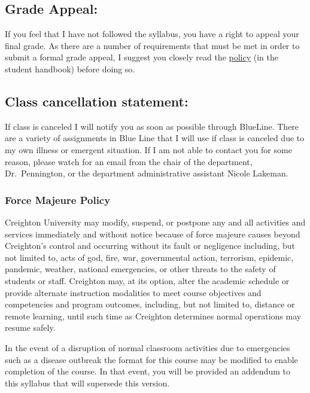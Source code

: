 \documentclass[
  11pt,
  letterpaper,
  DIV=11,
  numbers=noendperiod]{scrartcl}
\begin{document}
\subsection{Grade Appeal:}\label{grade-appeal}

If you feel that I have not followed the syllabus, you have a right to
appeal your final grade. As there are a number of requirements that must
be met in order to submit a formal grade appeal, I suggest you closely
read the
\href{https://catalog.creighton.edu/pharmacy-health-professions/administration-academic-policies/grade-appeals-policy/grade-appeals-policy.pdf}{policy}
(in the student handbook) before doing so.

\subsection{Class cancellation
statement:}\label{class-cancellation-statement}

If class is canceled I will notify you as soon as possible through
BlueLine. There are a variety of assignments in Blue Line that I will
use if class is canceled due to my own illness or emergent situation. If
I am not able to contact you for some reason, please watch for an email
from the chair of the department, Dr.~Pennington, or the department
administrative assistant Nicole Lakeman.

\subsubsection{Force Majeure Policy}\label{force-majeure-policy}

Creighton University may modify, suspend, or postpone any and all
activities and services immediately and without notice because of force
majeure causes beyond Creighton's control and occurring without its
fault or negligence including, but not limited to, acts of god, fire,
war, governmental action, terrorism, epidemic, pandemic, weather,
national emergencies, or other threats to the safety of students or
staff. Creighton may, at its option, alter the academic schedule or
provide alternate instruction modalities to meet course objectives and
competencies and program outcomes, including, but not limited to,
distance or remote learning, until such time as Creighton determines
normal operations may resume safely.

In the event of a disruption of normal classroom activities due to
emergencies such as a disease outbreak the format for this course may be
modified to enable completion of the course. In that event, you will be
provided an addendum to this syllabus that will supersede this version.
\end{document}
